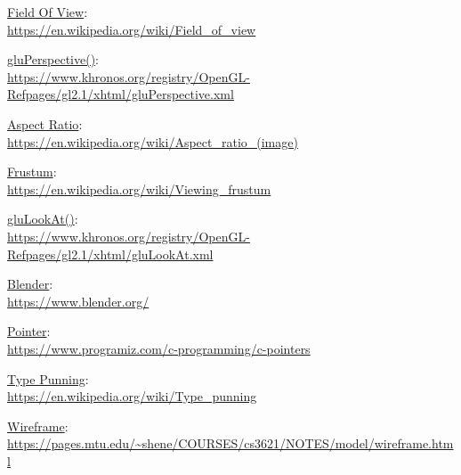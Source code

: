 \documentclass[12pt]{article}
\begin{document}
\pagebreak




\begin{thebibliography}{9}

\underline{Field Of View}:\\
\url{https://en.wikipedia.org/wiki/Field_of_view}

\underline{gluPerspective()}:\\
\url{https://www.khronos.org/registry/OpenGL-Refpages/gl2.1/xhtml/gluPerspective.xml}

\underline{Aspect Ratio}:\\
\url{https://en.wikipedia.org/wiki/Aspect_ratio_(image)}

\underline{Frustum}:\\
\url{https://en.wikipedia.org/wiki/Viewing_frustum}

\underline{gluLookAt()}:\\
\url{https://www.khronos.org/registry/OpenGL-Refpages/gl2.1/xhtml/gluLookAt.xml}

\underline{Blender}:\\
\url{https://www.blender.org/}

\underline{Pointer}:\\
\url{https://www.programiz.com/c-programming/c-pointers}

\underline{Type Punning}:\\
\url{https://en.wikipedia.org/wiki/Type_punning}

\underline{Wireframe}:\\
\url{https://pages.mtu.edu/~shene/COURSES/cs3621/NOTES/model/wireframe.html}



\end{thebibliography}
\end{document}
